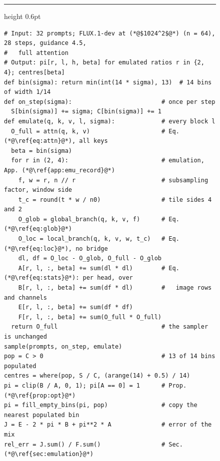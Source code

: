 \begin{figure}[p]
\noindent\begin{minipage}{\linewidth}
    \hrule height 0.6pt\vspace{2pt}
    \label{alg:emulate_full}
    \vspace{-4pt}
\begin{lstlisting}[style=scacode, basicstyle=\fontfamily{lmtt}\fontsize{8}{9}\selectfont, emph={bin,on_step,emulate,attn,global_branch,local_branch,sample,clip,where,arange,fill_empty_bins}]
# Input: 32 prompts; FLUX.1-dev at (*@$1024^2$@*) (n = 64), 28 steps, guidance 4.5,
#   full attention
# Output: pi[r, l, h, beta] for emulated ratios r in {2, 4}; centres[beta]
def bin(sigma): return min(int(14 * sigma), 13)  # 14 bins of width 1/14
def on_step(sigma):                         # once per step
  S[bin(sigma)] += sigma; C[bin(sigma)] += 1
def emulate(q, k, v, l, sigma):             # every block l
  O_full = attn(q, k, v)                    # Eq. (*@\ref{eq:attn}@*), all keys
  beta = bin(sigma)
  for r in (2, 4):                          # emulation, App. (*@\ref{app:emu_record}@*)
    f, w = r, n // r                        # subsampling factor, window side
    t_c = round(t * w / n0)                 # tile sides 4 and 2
    O_glob = global_branch(q, k, v, f)      # Eq. (*@\ref{eq:glob}@*)
    O_loc = local_branch(q, k, v, w, t_c)   # Eq. (*@\ref{eq:loc}@*), no bridge
    dl, df = O_loc - O_glob, O_full - O_glob
    A[r, l, :, beta] += sum(dl * dl)        # Eq. (*@\ref{eq:stats}@*): per head, over
    B[r, l, :, beta] += sum(df * dl)        #   image rows and channels
    E[r, l, :, beta] += sum(df * df)
    F[r, l, :, beta] += sum(O_full * O_full)
  return O_full                             # the sampler is unchanged
sample(prompts, on_step, emulate)
pop = C > 0                                 # 13 of 14 bins populated
centres = where(pop, S / C, (arange(14) + 0.5) / 14)
pi = clip(B / A, 0, 1); pi[A == 0] = 1      # Prop. (*@\ref{prop:opt}@*)
pi = fill_empty_bins(pi, pop)               # copy the nearest populated bin
J = E - 2 * pi * B + pi**2 * A              # error of the mix
rel_err = J.sum() / F.sum()                 # Sec. (*@\ref{sec:emulation}@*)
\end{lstlisting}
\end{minipage}


\end{figure}

